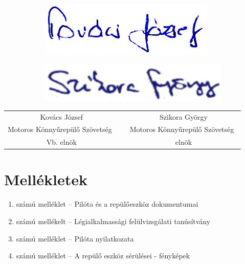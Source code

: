 \documentclass[a4paper,10pt]{article}
\newcommand{\mksz}{Motoros Könnyűrepülő Szövetség\ }
\begin{document}
\vspace{1cm}
\begin{figure}[h!]
\centering
\begin{subfigure}[h!]{0.30\textwidth}
\includegraphics{kepek/sign/kj}
\end{subfigure}
\hspace{4cm}
\begin{subfigure}[h!]{0.30\textwidth}
\includegraphics{kepek/sign/szgy}
\end{subfigure}
\end{figure}

\begin{tabular*}{16cm}{ccc}
 Kovács József&\hspace{3cm} &Szikora György\\
 \mksz&\hspace{3cm} &\mksz\\
 Vb. elnök&\hspace{3cm} &elnök\\
\end{tabular*}

\pagebreak
\section{Mellékletek}
\begin{enumerate}
 \item számú melléklet -- Pilóta és a repülőeszköz dokumentumai
 \item számú mellékelt -- Légialkalmassági felülvizsgálati tanúsítvány
 \item számú melléklet -- Pilóta nyilatkozata
 \item számú melléklet -- A repülő eszköz sérülései - fényképek
\end{enumerate}
\end{document}
